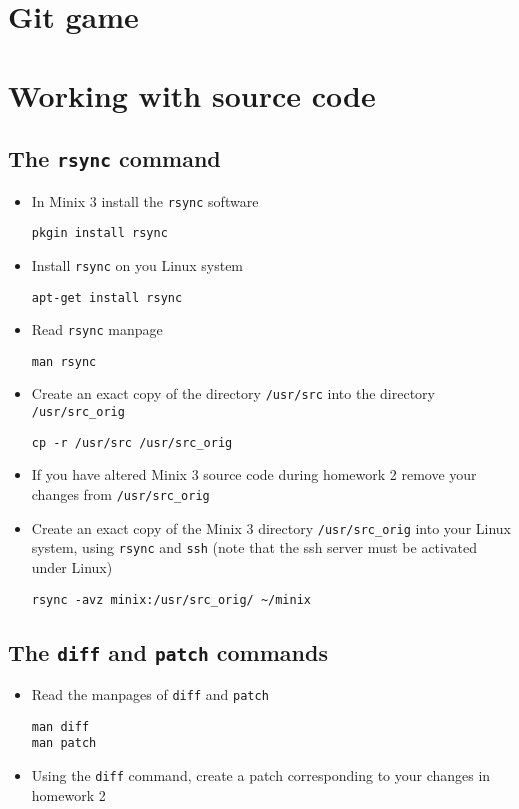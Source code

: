 \documentclass{article}
\begin{document}
\section{Git game}

\section{Working with source code}

\subsection{The \texttt{rsync} command}
\begin{itemize}
\item In Minix 3 install the \texttt{rsync} software
\begin{verbatim}
pkgin install rsync
\end{verbatim}
\item Install \texttt{rsync} on you Linux system
\begin{verbatim}
apt-get install rsync
\end{verbatim}
\item Read \texttt{rsync} manpage
\begin{verbatim}
man rsync
\end{verbatim}
\item Create an exact copy of the directory \texttt{/usr/src} into the directory \texttt{/usr/src_orig}
\begin{verbatim}
cp -r /usr/src /usr/src_orig
\end{verbatim}
\item If you have altered Minix 3 source code during homework 2 remove your changes from \texttt{/usr/src_orig}
\item Create an exact copy of the Minix 3 directory \texttt{/usr/src_orig} into your Linux system, using \texttt{rsync} and \texttt{ssh} (note that the ssh server must be activated under Linux)
\begin{verbatim}
rsync -avz minix:/usr/src_orig/ ~/minix
\end{verbatim}
\end{itemize}

\subsection{The \texttt{diff} and \texttt{patch} commands}
\begin{itemize}
\item Read the manpages of \texttt{diff} and \texttt{patch}
\begin{verbatim}
man diff
man patch
\end{verbatim}
\item Using the \texttt{diff} command, create a patch corresponding to your changes in homework 2

\end{itemize}
\end{document}
